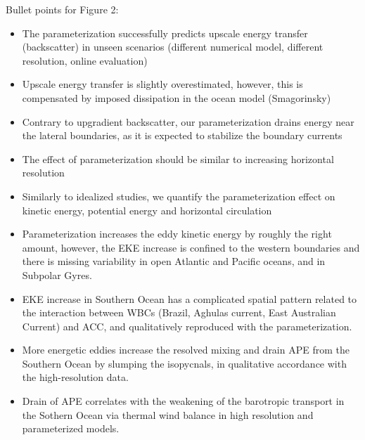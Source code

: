 \documentclass[draft]{agujournal2019}
\begin{document}
Bullet points for Figure 2:
\begin{itemize}
    \item The parameterization successfully predicts upscale energy transfer (backscatter) in unseen scenarios (different numerical model, different resolution, online evaluation)
    \item Upscale energy transfer is slightly overestimated, however, this is compensated by imposed dissipation in the ocean model (Smagorinsky)
    \item Contrary to upgradient backscatter, our parameterization drains energy near the lateral boundaries, as it is expected to stabilize the boundary currents
    \item The effect of parameterization should be similar to increasing horizontal resolution
    \item Similarly to idealized studies, we quantify the parameterization effect on kinetic energy, potential energy and horizontal circulation
    \item Parameterization increases the eddy kinetic energy by roughly the right amount, however, the EKE increase is confined to the western boundaries and there is missing variability in open Atlantic and Pacific oceans, and in Subpolar Gyres.
    \item EKE increase in Southern Ocean has a complicated spatial pattern related to the interaction between WBCs (Brazil, Aghulas current, East Australian Current) and ACC, and qualitatively reproduced with the parameterization.
    \item More energetic eddies increase the resolved mixing and drain APE from the Southern Ocean by slumping the isopycnals, in qualitative accordance with the high-resolution data.
    \item Drain of APE correlates with the weakening of the barotropic transport in the Sothern Ocean via thermal wind balance in high resolution and parameterized models.
    
\end{itemize}







%

%

%
\end{document}
